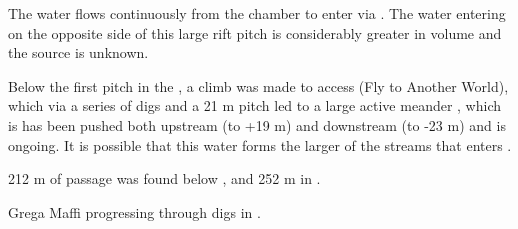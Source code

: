The  water flows continuously from the  chamber to enter  via .
The water entering on the opposite side of this large rift pitch is
considerably greater in volume and the source is unknown.

Below the first pitch in the , a climb was made to
access  (Fly to Another World), which via a
series of digs and a 21 m pitch led to a large active meander , which is has been
pushed both upstream (to +19 m) and downstream (to -23 m) and is
ongoing. It is possible that this water forms the larger of the streams
that enters .

212 m of passage was found below , and 252 m in
.

\begin{marginfigure}
\checkoddpage \ifoddpage \forcerectofloat \else \forceversofloat \fi
\centering
 \caption{Grega Maffi progressing through digs in \protect{}. }
 \label{let na drugi svet dig 1}
\end{marginfigure}



